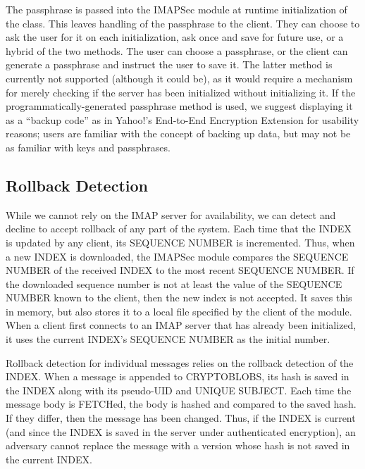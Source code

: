 \documentclass[pageno]{jpaper}
\newcommand{\project}{IMAPSec }
\begin{document}
The passphrase is passed into the \project module at runtime initialization of the class. This leaves handling of the passphrase to the client. They can choose to ask the user for it on each initialization, ask once and save for future use, or a hybrid of the two methods. The user can choose a passphrase, or the client can generate a passphrase and instruct the user to save it. The latter method is currently not supported (although it could be), as it would require a mechanism for merely checking if the server has been initialized without initializing it. If the programmatically-generated passphrase method is used, we suggest displaying it as a ``backup code'' as in Yahoo!'s End-to-End Encryption Extension \cite{yahoo} for usability reasons; users are familiar with the concept of backing up data, but may not be as familiar with keys and passphrases.


\label{rollback}
\subsection{Rollback Detection}
While we cannot rely on the IMAP server for availability, we can detect and decline to accept rollback of any part of the system. Each time that the INDEX is updated by any client, its SEQUENCE NUMBER is incremented. Thus, when a new INDEX is downloaded, the \project module compares the SEQUENCE NUMBER of the received INDEX to the most recent SEQUENCE NUMBER. If the downloaded sequence number is not at least the value of the SEQUENCE NUMBER known to the client, then the new index is not accepted. It saves this in memory, but also stores it to a local file specified by the client of the module. When a client first connects to an IMAP server that has already been initialized, it uses the current INDEX's SEQUENCE NUMBER as the initial number.

Rollback detection for individual messages relies on the rollback detection of the INDEX. When a message is appended to CRYPTOBLOBS, its hash is saved in the INDEX along with its pseudo-UID and UNIQUE SUBJECT. Each time the message body is FETCHed, the body is hashed and compared to the saved hash. If they differ, then the message has been changed. Thus, if the INDEX is current (and since the INDEX is saved in the server under authenticated encryption), an adversary cannot replace the message with a version whose hash is not saved in the current INDEX.
\end{document}
